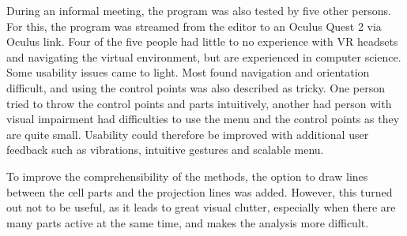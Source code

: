 During an informal meeting, the program was also tested by five other persons. For this, the program was streamed from the editor to an Oculus Quest 2 via Oculus link. Four of the five people had little to no experience with VR headsets and navigating the virtual environment, but are experienced in computer science. Some usability issues came to light. Most found navigation and orientation difficult, and using the control points was also described as tricky. One person tried to throw the control points and parts intuitively, another had person with visual impairment had difficulties to use the menu and the control points as they are quite small. Usability could therefore be improved with additional user feedback such as vibrations, intuitive gestures and scalable menu.

To improve the comprehensibility of the methods, the option to draw lines between the cell parts and the projection lines was added. However, this turned out not to be useful, as it leads to great visual clutter, especially when there are many parts active at the same time, and makes the analysis more difficult.

